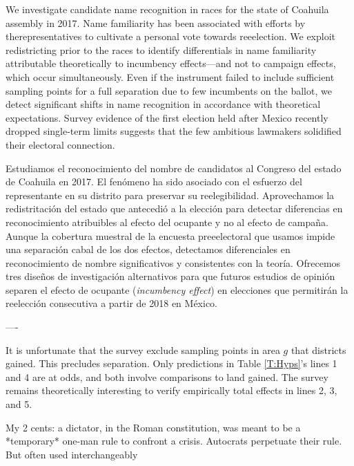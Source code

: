 
\noindent We investigate candidate name recognition in races for the state of Coahuila assembly in 2017. Name familiarity has been associated with efforts by therepresentatives to cultivate a personal vote towards reeelection. We exploit redistricting prior to the races to identify differentials in name familiarity attributable theoretically to incumbency effects---and not to campaign effects, which occur simultaneously. Even if the instrument failed to include sufficient sampling points for a full separation due to few incumbents on the ballot, we detect significant shifts in name recognition in accordance with theoretical expectations. Survey evidence of the first election held after Mexico recently dropped single-term limits suggests that the few ambitious lawmakers solidified their electoral connection. 




Estudiamos el reconocimiento del nombre de candidatos al Congreso del estado de Coahuila en 2017. El fenómeno ha sido asociado con el esfuerzo del representante en su distrito para preservar su reelegibilidad. Aprovechamos la redistritación del estado que antecedió a la elección para detectar diferencias en reconocimiento atribuibles al efecto del ocupante y no al efecto de campaña. Aunque la cobertura muestral de la encuesta preeelectoral que usamos impide una separación cabal de los dos efectos, detectamos diferenciales en reconocimiento de nombre significativos y consistentes con la teoría. Ofrecemos tres diseños de investigación alternativos para que futuros estudios de opinión separen el efecto de ocupante (\emph{incumbency effect}) en elecciones que permitirán la reelección consecutiva a partir de 2018 en México. 

----


It is unfortunate that the survey exclude sampling points in area $g$ that districts gained. This precludes separation. Only predictions in Table \ref{T:Hyps}'s lines 1 and 4 are at odds, and both involve comparisons to land gained. The survey remains theoretically interesting to verify empirically total effects in lines 2, 3, and 5. 

My 2 cents: a dictator, in the Roman constitution, was meant to be a *temporary* one-man rule to confront a crisis. Autocrats perpetuate their rule. But often used interchangeably  


